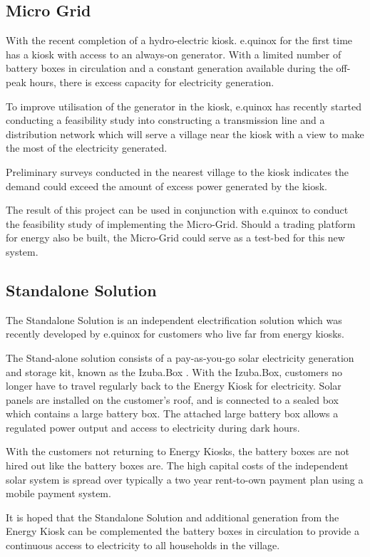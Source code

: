 \subsection*{Micro Grid}
With the recent completion of a hydro-electric kiosk. e.quinox for the first time has a kiosk with access to an always-on generator. With a limited number of battery boxes in circulation and a constant generation available during the off-peak hours, there is excess capacity for electricity generation.

To improve utilisation of the generator in the kiosk, e.quinox has recently started conducting a feasibility study into constructing a transmission line and a distribution network which will serve a village near the kiosk with a view to make the most of the electricity generated.

Preliminary surveys conducted in the nearest village to the kiosk indicates the demand could exceed the amount of excess power generated by the kiosk. 

The result of this project can be used in conjunction with e.quinox to conduct the feasibility study of implementing the Micro-Grid. Should a trading platform for energy also be built, the Micro-Grid could serve as a test-bed for this new system.

\subsection*{Standalone Solution}
The Standalone Solution is an independent electrification solution which was recently developed by e.quinox for customers who live far from energy kiosks.

The Stand-alone solution consists of a pay-as-you-go solar electricity generation and storage kit, known as the Izuba.Box \cite{e.quinox-Standalone-web:2012}.  With the Izuba.Box, customers no longer have to travel regularly back to the Energy Kiosk for electricity. Solar panels are installed on the customer’s roof, and is connected to a sealed box which contains a large battery box. The attached large battery box allows a regulated power output and access to electricity during dark hours. 

With the customers not returning to Energy Kiosks, the battery boxes are not hired out like the battery boxes are. The high capital costs of the independent solar system is spread over typically a two year rent-to-own payment plan using a mobile payment system.

It is hoped that the Standalone Solution and additional generation from the Energy Kiosk can be complemented the battery boxes in circulation to provide a continuous access to electricity to all households in the village.

